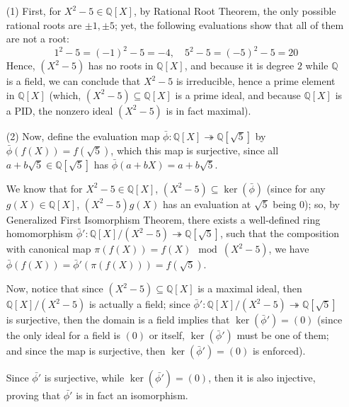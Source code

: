 \documentclass{article}
\begin{document}
\begin{itemize}
    \item[(1)] First, for $X^2-5\in \mathbb{Q}[X]$, by Rational Root Theorem, the only possible rational roots are $\pm 1,\pm 5$; yet, the following evaluations show that all of them are not a root:
    $$1^2-5 = (-1)^2-5 = -4,\quad 5^2-5 = (-5)^2-5 = 20$$
    Hence, $(X^2-5)$ has no roots in $\mathbb{Q}[X]$, and because it is degree $2$ while $\mathbb{Q}$ is a field, we can conclude that $X^2-5$ is irreducible, hence a prime element in $\mathbb{Q}[X]$ (which, $(X^2-5)\subseteq \mathbb{Q}[X]$ is a prime ideal, 
    and because $\mathbb{Q}[X]$ is a PID, the nonzero ideal $(X^2-5)$ is in fact maximal).

    \hfil

    \item[(2)] Now, define the evaluation map $\bar{\phi}:\mathbb{Q}[X]\twoheadrightarrow \mathbb{Q}[\sqrt{5}]$ by 
    $\bar{\phi}(f(X))=f(\sqrt{5})$, which this map is surjective, since all $a+b\sqrt{5}\in\mathbb{Q}[\sqrt{5}]$ has $\bar{\phi}(a+bX)=a+b\sqrt{5}$.
    
    We know that for $X^2-5\in \mathbb{Q}[X]$, $(X^2-5)\subseteq \ker(\bar{\phi})$ (since for any $g(X)\in\mathbb{Q}[X]$, $(X^2-5)g(X)$ has an evaluation at $\sqrt{5}$ being $0$); so, by Generalized First Isomorphism Theorem, 
    there exists a well-defined ring homomorphism $\bar{\phi}':\mathbb{Q}[X]/(X^2-5)\twoheadrightarrow \mathbb{Q}[\sqrt{5}]$, such that the composition with canonical map $\pi(f(X))=f(X)\mod (X^2-5)$, we have $\bar{\phi}(f(X))=\bar{\phi}'(\pi(f(X)))=f(\sqrt{5})$.

    Now, notice that since $(X^2-5)\subseteq \mathbb{Q}[X]$ is a maximal ideal, then $\mathbb{Q}[X]/(X^2-5)$ is actually a field;
    since $\bar{\phi}':\mathbb{Q}[X]/(X^2-5)\twoheadrightarrow \mathbb{Q}[\sqrt{5}]$ is surjective, then the domain is a field implies that $\ker(\bar{\phi}') = (0)$ (since the only ideal for a field is $(0)$ or itself, $\ker(\bar{\phi}')$ must be one of them; and since the map is surjective,
    then $\ker(\bar{\phi}')=(0)$ is enforced). 

    Since $\bar{\phi'}$ is surjective, while $\ker(\bar{\phi'})=(0)$, then it is also injective, proving that $\bar{\phi'}$ is in fact an isomorphism. 
    
    \hfil


\end{itemize}
\end{document}
